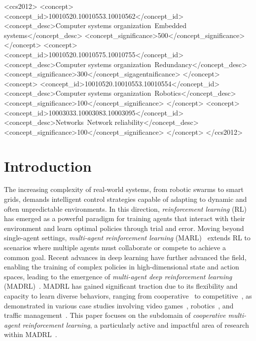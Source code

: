 \documentclass[sigconf]{acmart}
\begin{document}
%
\begin{CCSXML}
<ccs2012>
 <concept>
  <concept_id>10010520.10010553.10010562</concept_id>
  <concept_desc>Computer systems organization~Embedded systems</concept_desc>
  <concept_significance>500</concept_significance>
 </concept>
 <concept>
  <concept_id>10010520.10010575.10010755</concept_id>
  <concept_desc>Computer systems organization~Redundancy</concept_desc>
  <concept_significance>300</concept_sigagentnificance>
 </concept>
 <concept>
  <concept_id>10010520.10010553.10010554</concept_id>
  <concept_desc>Computer systems organization~Robotics</concept_desc>
  <concept_significance>100</concept_significance>
 </concept>
 <concept>
  <concept_id>10003033.10003083.10003095</concept_id>
  <concept_desc>Networks~Network reliability</concept_desc>
  <concept_significance>100</concept_significance>
 </concept>
</ccs2012>  
\end{CCSXML}



\maketitle

\section{Introduction}
The increasing complexity of real-world systems, from robotic swarms to smart grids, demands intelligent control strategies capable of adapting to dynamic and often unpredictable environments.
%
In this direction, \emph{reinforcement learning} (RL)~\cite{sutton2018reinforcement} has emerged as a powerful paradigm for training agents that interact with their environment and learn optimal policies through trial and error.
%
Moving beyond single-agent settings, \emph{multi-agent reinforcement learning} (MARL)~\cite{bucsoniu2010multi} extends RL to scenarios where multiple agents must collaborate or compete to achieve a common goal.
%
Recent advances in deep learning have further advanced the field, 
enabling the training of complex policies in high-dimensional state and action spaces, 
leading to the emergence of \emph{multi-agent deep reinforcement learning} (MADRL)~\cite{gronauer2022multi}.
%
MADRL has gained significant traction due to its flexibility and capacity to learn diverse behaviors, 
ranging from cooperative~\cite{gupta2017cooperative} to competitive~\cite{tampuu2017multiagent}, 
as demonstrated in various case studies involving video games~\cite{shao2019survey}, robotics~\cite{orr2023multi},
and traffic management~\cite{chu2019multi}. 
%
This paper focuses on the subdomain of \emph{cooperative multi-agent reinforcement learning}, 
a particularly active and impactful area of research within MADRL~\cite{oroojlooy2023review}.
\end{document}
